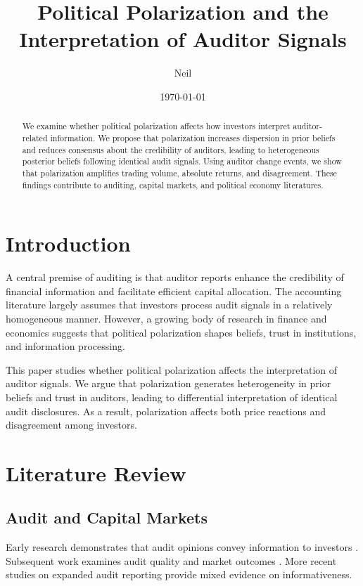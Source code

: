 \documentclass[12pt]{article}
\title{Political Polarization and the Interpretation of Auditor Signals}
\author{Neil}
\date{\today}
\begin{document}
\maketitle
\onehalfspacing

\begin{abstract}
We examine whether political polarization affects how investors interpret auditor-related information. We propose that polarization increases dispersion in prior beliefs and reduces consensus about the credibility of auditors, leading to heterogeneous posterior beliefs following identical audit signals. Using auditor change events, we show that polarization amplifies trading volume, absolute returns, and disagreement. These findings contribute to auditing, capital markets, and political economy literatures.
\end{abstract}

\section{Introduction}

A central premise of auditing is that auditor reports enhance the credibility of financial information and facilitate efficient capital allocation. The accounting literature largely assumes that investors process audit signals in a relatively homogeneous manner. However, a growing body of research in finance and economics suggests that political polarization shapes beliefs, trust in institutions, and information processing.

This paper studies whether political polarization affects the interpretation of auditor signals. We argue that polarization generates heterogeneity in prior beliefs and trust in auditors, leading to differential interpretation of identical audit disclosures. As a result, polarization affects both price reactions and disagreement among investors.

\section{Literature Review}

\subsection{Audit and Capital Markets}

Early research demonstrates that audit opinions convey information to investors \citep{firth1978,dodd1984}. Subsequent work examines audit quality and market outcomes \citep{francis2004,defond2014}. More recent studies on expanded audit reporting provide mixed evidence on informativeness.
\end{document}
